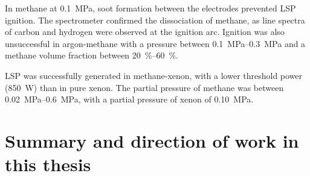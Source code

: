         In methane at \qty{0.1}{MPa}, soot formation between the electrodes prevented LSP ignition. The spectrometer confirmed the dissociation of methane, as line spectra of carbon and hydrogen were observed at the ignition arc. Ignition was also unsuccessful in argon-methane with a pressure between \qtyrange{0.1}{0.3}{MPa} and a methane volume fraction between \qtyrange{20}{60}{\%}. 
        
        LSP was successfully generated in methane-xenon, with a lower threshold power (\qty{850}{W}) than in pure xenon. The partial pressure of methane was between \qtyrange{0.02}{0.6}{MPa}, with a partial pressure of xenon of \qty{0.10}{MPa}.

    \section{Summary and direction of work in this thesis}

